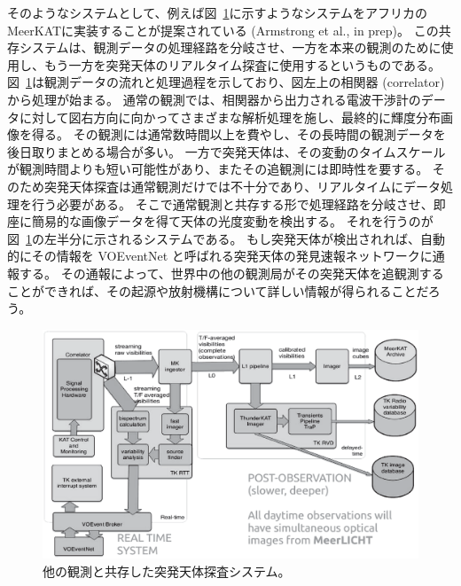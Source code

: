 そのようなシステムとして、例えば図~\ref{fig:transients.fender.commensal}に示すようなシステムをアフリカのMeerKATに実装することが提案されている (Armstrong et al., in prep)。
この共存システムは、観測データの処理経路を分岐させ、一方を本来の観測のために使用し、もう一方を突発天体のリアルタイム探査に使用するというものである。
図~\ref{fig:transients.fender.commensal}は観測データの流れと処理過程を示しており、図左上の相関器 (correlator) から処理が始まる。
通常の観測では、相関器から出力される電波干渉計のデータに対して図右方向に向かってさまざまな解析処理を施し、最終的に輝度分布画像を得る。
その観測には通常数時間以上を費やし、その長時間の観測データを後日取りまとめる場合が多い。
一方で突発天体は、その変動のタイムスケールが観測時間よりも短い可能性があり、またその追観測には即時性を要する。
そのため突発天体探査は通常観測だけでは不十分であり、リアルタイムにデータ処理を行う必要がある。
そこで通常観測と共存する形で処理経路を分岐させ、即座に簡易的な画像データを得て天体の光度変動を検出する。
それを行うのが図~\ref{fig:transients.fender.commensal}の左半分に示されるシステムである。
もし突発天体が検出されれば、自動的にその情報を VOEventNet と呼ばれる突発天体の発見速報ネットワークに通報する。
その通報によって、世界中の他の観測局がその突発天体を追観測することができれば、その起源や放射機構について詳しい情報が得られることだろう。
\begin{figure}
	\centering
	\includegraphics[width=12cm]{transients/transients.s2.fender.commensal.eps}
	\caption{他の観測と共存した突発天体探査システム。}
	\label{fig:transients.fender.commensal}
\end{figure}%

